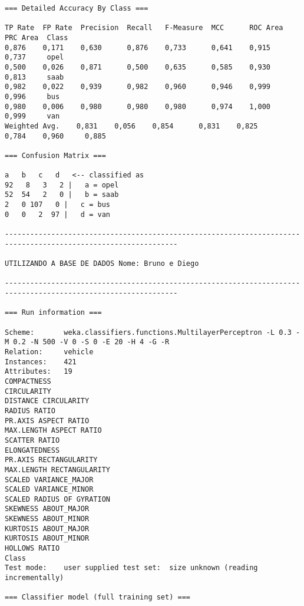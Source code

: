\documentclass[
	article,			%
	11pt,				%
	oneside,			%
	a4paper,			%
	english,			%
	brazil,				%
	sumario=tradicional
	]{abntex2}
\begin{document}
\begin{lstlisting}
=== Detailed Accuracy By Class ===

TP Rate  FP Rate  Precision  Recall   F-Measure  MCC      ROC Area  PRC Area  Class
0,876    0,171    0,630      0,876    0,733      0,641    0,915     0,737     opel
0,500    0,026    0,871      0,500    0,635      0,585    0,930     0,813     saab
0,982    0,022    0,939      0,982    0,960      0,946    0,999     0,996     bus
0,980    0,006    0,980      0,980    0,980      0,974    1,000     0,999     van
Weighted Avg.    0,831    0,056    0,854      0,831    0,825      0,784    0,960     0,885     

=== Confusion Matrix ===

a   b   c   d   <-- classified as
92   8   3   2 |   a = opel
52  54   2   0 |   b = saab
2   0 107   0 |   c = bus
0   0   2  97 |   d = van

---------------------------------------------------------------------------------------------------------------

UTILIZANDO A BASE DE DADOS Nome: Bruno e Diego

---------------------------------------------------------------------------------------------------------------

=== Run information ===

Scheme:       weka.classifiers.functions.MultilayerPerceptron -L 0.3 -M 0.2 -N 500 -V 0 -S 0 -E 20 -H 4 -G -R
Relation:     vehicle
Instances:    421
Attributes:   19
COMPACTNESS
CIRCULARITY
DISTANCE CIRCULARITY
RADIUS RATIO
PR.AXIS ASPECT RATIO
MAX.LENGTH ASPECT RATIO
SCATTER RATIO
ELONGATEDNESS
PR.AXIS RECTANGULARITY
MAX.LENGTH RECTANGULARITY
SCALED VARIANCE_MAJOR
SCALED VARIANCE_MINOR
SCALED RADIUS OF GYRATION
SKEWNESS ABOUT_MAJOR
SKEWNESS ABOUT_MINOR
KURTOSIS ABOUT_MAJOR
KURTOSIS ABOUT_MINOR
HOLLOWS RATIO
Class
Test mode:    user supplied test set:  size unknown (reading incrementally)

=== Classifier model (full training set) ===


\end{lstlisting}
\end{document}

